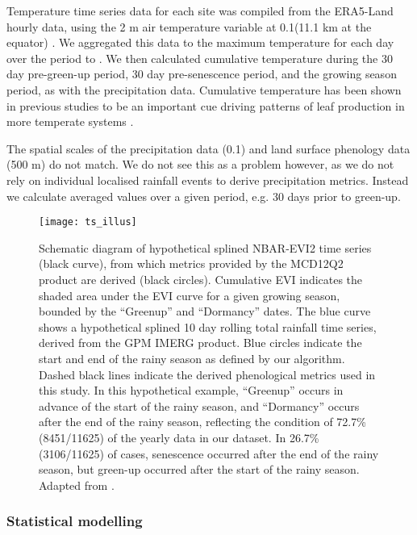 \documentclass[11pt,a4paper]{article}
\begin{document}
Temperature time series data for each site was compiled from the ERA5-Land
hourly data, using the 2 m air temperature variable at 0.1\textdegree (11.1 km
at the equator) \citep{ERA5}. We aggregated this data to the maximum
temperature for each day over the period \modisStart{} to \modisEnd{}. We then
calculated cumulative temperature during the 30 day pre-green-up period, 30 day
pre-senescence period, and the growing season period, as with the precipitation
data. Cumulative temperature has been shown in previous studies to be an
important cue driving patterns of leaf production in more temperate systems
\citep{Archibald2007, Michelson2017, Escamilla2020}.

The spatial scales of the precipitation data (0.1\textdegree{}) and land
surface phenology data (500 m) do not match. We do not see this as a problem
however, as we do not rely on individual localised rainfall events to derive
precipitation metrics. Instead we calculate averaged values over a given
period, e.g. 30 days prior to green-up. 

\begin{figure}[H]
\centering
	\texttt{[image: ts\_illus]}
	\caption{Schematic diagram of hypothetical splined NBAR-EVI2 time series
		(black curve), from which metrics provided by the MCD12Q2 product are
		derived (black circles). Cumulative EVI indicates the shaded area under the EVI
		curve for a given growing season, bounded by the ``Greenup'' and ``Dormancy''
		dates. The blue curve shows a hypothetical splined 10 day rolling total
		rainfall time series, derived from the GPM IMERG product. Blue circles indicate
		the start and end of the rainy season as defined by our algorithm. Dashed black
		lines indicate the derived phenological metrics used in this study. In this
		hypothetical example, ``Greenup'' occurs in advance of the start of the rainy
		season, and ``Dormancy'' occurs after the end of the rainy season, reflecting
		the condition of 72.7\% (8451/11625) of the yearly data in our dataset. In
		26.7\% (3106/11625) of cases, senescence occurred after the end of the rainy
		season, but green-up occurred after the start of the rainy season. Adapted from
		\citep{Gray2022}.}
	\label{ts_illus}
\end{figure}

\subsubsection{Statistical modelling}
\end{document}
